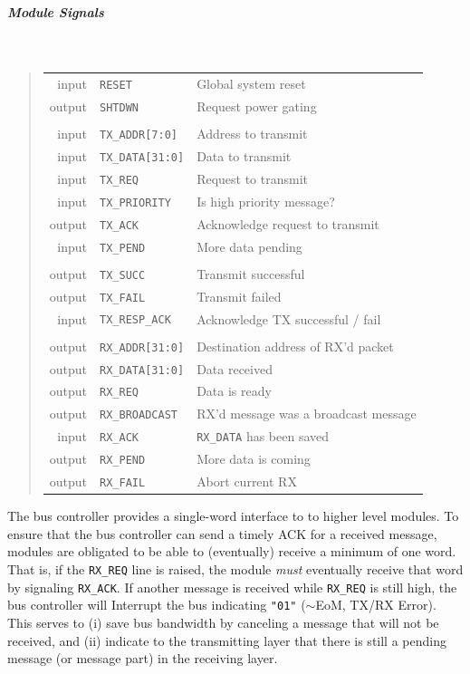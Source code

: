 \subparagraph{Module Signals}
\label{sec:bus-controller-signals-module}
~

\begin{quote}
\begin{tabular}{r l l}
  {\sc  input} & {\tt RESET} & Global system reset \\
  {\sc output} & {\tt SHTDWN} & Request power gating \\
  & & \\
  {\sc  input} & {\tt TX\_ADDR[7:0]} & Address to transmit \\
  {\sc  input} & {\tt TX\_DATA[31:0]} & Data to transmit \\
  {\sc  input} & {\tt TX\_REQ} & Request to transmit \\
  {\sc  input} & {\tt TX\_PRIORITY} & Is high priority message? \\
  {\sc output} & {\tt TX\_ACK} & Acknowledge request to transmit \\
  {\sc  input} & {\tt TX\_PEND} & More data pending \\
  & & \\
  {\sc output} & {\tt TX\_SUCC} & Transmit successful \\
  {\sc output} & {\tt TX\_FAIL} & Transmit failed \\
  {\sc  input} & {\tt TX\_RESP\_ACK} & Acknowledge TX successful / fail \\
  & & \\
  {\sc output} & {\tt RX\_ADDR[31:0]} & Destination address of RX'd packet \\
  {\sc output} & {\tt RX\_DATA[31:0]} & Data received \\
  {\sc output} & {\tt RX\_REQ} & Data is ready \\
  {\sc output} & {\tt RX\_BROADCAST} & RX'd message was a broadcast message \\
  {\sc  input} & {\tt RX\_ACK} & {\tt RX\_DATA} has been saved \\
  {\sc output} & {\tt RX\_PEND} & More data is coming \\
  {\sc output} & {\tt RX\_FAIL} & Abort current RX \\
\end{tabular}
\end{quote}

The bus controller provides a single-word interface to \bus to higher level
modules. To ensure that the bus controller can send a timely ACK for a
received message, modules are obligated to be able to (eventually) receive a
minimum of one word. That is, if the {\tt RX\_REQ} line is raised, the module
{\em must} eventually receive that word by signaling {\tt RX\_ACK}. If another
message is received while {\tt RX\_REQ} is still high, the bus controller will
Interrupt the bus indicating {\tt "01"} ($\sim$EoM, TX/RX Error). This serves
to (i) save bus bandwidth by canceling a message that will not be received,
and (ii) indicate to the transmitting layer that there is still a pending
message (or message part) in the receiving layer.

